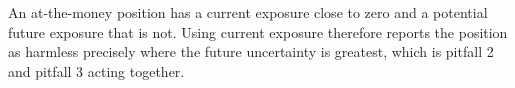 \begin{crtrapbox}
An at-the-money position has a current exposure close to zero and a potential
future exposure that is not. Using current exposure therefore reports the
position as harmless precisely where the future uncertainty is greatest, which is
pitfall 2 and pitfall 3 acting together.
\end{crtrapbox}
